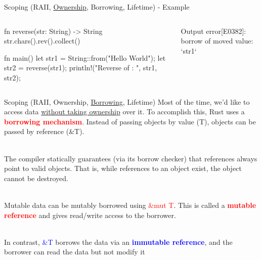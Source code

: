 \documentclass[10pt,xcolor={dvipsnames}, aspectratio=169]{beamer}
\begin{document}
	\begin{frame}[fragile]{Scoping (RAII, \underline{Ownership}, Borrowing, Lifetime) - Example}
		\begin{columns}[T]
			\begin{column}{0.5 \textwidth}
                \begin{rustcode}

    fn reverse(str: String) -> String {
        str.chars().rev().collect()
    }
    
    fn main() {
        let str1 = String::from("Hello World");
        let str2 = reverse(str1);
        println!("Reverse of {}: {}", str1, str2);
    }
                \end{rustcode}
			\end{column}
			\begin{column}{0.5 \textwidth}
			    \vspace{1cm}
				\begin{block}{Output}
					error[E0382]: borrow of moved value: `str1`
				\end{block}
			\end{column}
		\end{columns}
	\end{frame}
	\begin{frame}{Scoping (RAII, Ownership, \underline{Borrowing}, Lifetime)}
		Most of the time, we'd like to access data \underline{without taking ownership} over it. To accomplish this, Rust uses a \textcolor{red}{\textbf{borrowing mechanism}}. Instead of passing objects by value (T), objects can be passed by reference (\&T).
		
		~\\The compiler statically guarantees (via its borrow checker) that references always point to valid objects. That is, while references to an object exist, the object cannot be destroyed.
		
		~\\Mutable data can be mutably borrowed using \textcolor{red}{\&mut T}. This is called a \textcolor{red}{\textbf{mutable reference}} and gives read/write access to the borrower.
		
		~\\In contrast, \textcolor{blue}{\&T} borrows the data via an \textcolor{blue}{\textbf{immutable reference}}, and the borrower can read the data but not modify it
	\end{frame}
\end{document}
